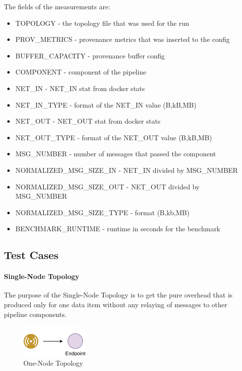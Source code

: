 The fields of the measurements are:

\begin{itemize}
\item TOPOLOGY - the topology file that was used for the run
\item PROV\_METRICS - provenance metrics that was inserted to the config
\item BUFFER\_CAPACITY - provenance buffer config
\item COMPONENT - component of the pipeline
\item NET\_IN - NET\_IN stat from docker stats
\item NET\_IN\_TYPE - format of the NET\_IN value (B,kB,MB) 
\item NET\_OUT - NET\_OUT stat from docker stats
\item NET\_OUT\_TYPE - format of the NET\_OUT value (B,kB,MB) 
\item MSG\_NUMBER - number of messages that passed the component
\item NORMALIZED\_MSG\_SIZE\_IN - NET\_IN divided by MSG\_NUMBER
\item NORMALIZED\_MSG\_SIZE\_OUT - NET\_OUT divided by MSG\_NUMBER
\item NORMALIZED\_MSG\_SIZE\_TYPE - format (B,kb,MB)
\item BENCHMARK\_RUNTIME - runtime in seconds for the benchmark
\end{itemize}

\subsection{Test Cases}
\paragraph*{Single-Node Topology}
The purpose of the Single-Node Topology is to get the pure overhead that is produced only for one data item without any relaying of messages to other pipeline components.

\begin{figure}[H]
	\center
	\includegraphics[width=0.3\textwidth]{figures/dataoverheadtopolabeled0.png}
	\caption{One-Node Topology}
	\label{fig:onetodetopology}
\end{figure}


